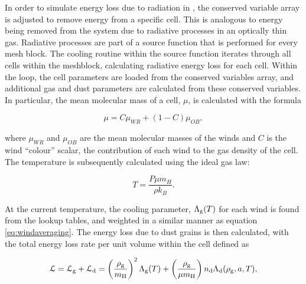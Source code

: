 In order to simulate energy loss due to radiation in \athena{}, the conserved variable array is adjusted to remove energy from a specific cell.
This is analogous to energy being removed from the system due to radiative processes in an optically thin gas.
Radiative processes are part of a source function that is performed for every mesh block.
The cooling routine within the source function iterates through all cells within the meshblock, calculating radiative energy loss for each cell.
Within the loop, the cell parameters are loaded from the conserved variables array, and additional gas and dust parameters are calculated from these conserved variables.
In particular, the mean molecular mass of a cell, $\mu$, is calculated with the formula

\begin{equation}
  \mu = C\mu_{WR} + (1-C) \mu_{OB}, \label{eq:windaveraging}
\end{equation}

\noindent
where $\mu_{WR}$ and $\mu_{OB}$ are the mean molecular masses of the winds and $C$ is the wind ``colour'' scalar, the contribution of each wind to the gas density of the cell.
The temperature is subsequently calculated using the ideal gas law:

\begin{equation}
  \label{eq:c3-idealgas}
  T = \frac{P \mu m_H}{\rho k_B}.
\end{equation}

\noindent
At the current temperature, the cooling parameter, $\Lambda_\text{g}(T)$ for each wind is found from the lookup tables, and weighted in a similar manner as equation \ref{eq:windaveraging}. The energy loss due to dust grains is then calculated, with the total energy loss rate per unit volume within the cell defined as


\begin{equation}
  \label{eq:c3-energyloss}
  \mathcal{L} = \mathcal{L}_\text{g} + \mathcal{L}_\text{d} = \left(\frac{\rho_\text{g}}{m_\text{H}}\right)^2 \Lambda_\text{g}(T) + \left(\frac{\rho_\text{g}}{\mu m_\text{H}}\right) n_\text{d} \Lambda_\text{d}(\rho_\text{g},a,T),
\end{equation}


